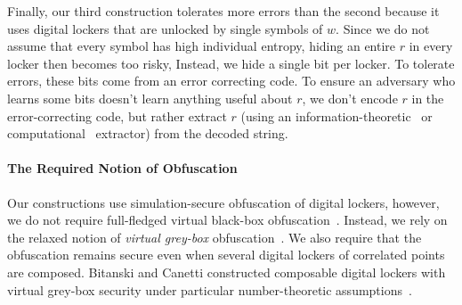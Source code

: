 \documentclass[11pt]{article}
\newcommand{\authnote}[2]{{\textcolor{red}{\textsf{#1 notes: }\textcolor{blue}{ #2}}\marginpar{\textcolor{red}{\textbf{!!!!!}}}}}
\newcommand{\authnote}[2]{}
\newcommand{\bnote}[1]{{\authnote{Ben}{#1}}}
\newcommand{\lnote}[1]{{\authnote{Leo}{#1}}}
\begin{document}
Finally, our third construction tolerates more errors than the second because it uses digital lockers that are unlocked by single symbols of $w$. Since we do not assume that every symbol has high individual entropy, hiding an entire $r$ in every locker then becomes too risky, Instead, we hide a single bit per locker. To tolerate errors, these bits come from an error correcting code. To ensure an  adversary who learns some bits doesn't learn anything useful about $r$, we don't encode $r$ in the error-correcting code, but rather extract $r$ (using an information-theoretic~\cite{nisan1993randomness} or computational~\cite{krawczyk2010cryptographic} extractor) from the decoded string.



\paragraph{The Required Notion of Obfuscation} 
Our constructions use simulation-secure  obfuscation of digital lockers, however, we do not require full-fledged virtual black-box obfuscation~\cite{barak2001possibility}. Instead, we rely on the relaxed notion of \emph{virtual grey-box} obfuscation~\cite{bitansky2010strong}. We also require that the obfuscation remains secure even when several digital lockers of correlated points are composed.
Bitanski and Canetti constructed composable digital lockers with virtual grey-box security under particular number-theoretic assumptions~\cite{bitansky2010strong}.
\end{document}
